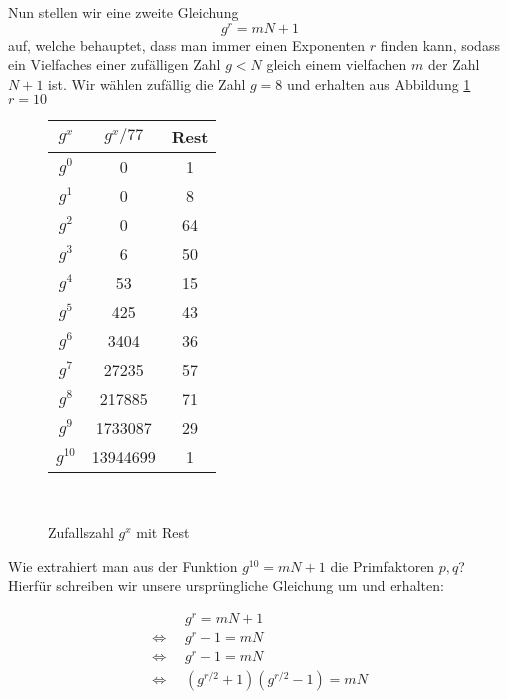 Nun stellen wir eine zweite Gleichung 
$${g^r = mN+1}$$ 
auf, welche behauptet, dass man immer einen Exponenten $r$ finden kann, sodass ein Vielfaches einer zufälligen Zahl $g < N$ gleich einem vielfachen $m$ der Zahl $N+1$ ist.
Wir wählen zufällig die Zahl $g = 8$ und erhalten aus Abbildung \ref{fig:Zufallszahl $g^x$ mit Rest} $r = 10$

\begin{figure}[h]
    \begin{center}
        \begin{tabular}{|c|c|c|} \hline
            $g^x$       &   $g^x/77$    &   Rest    \\\hline
            $g^0$       &   0           &   1       \\\hline
            $g^1$       &   0           &   8       \\\hline
            $g^2$       &   0           &   64      \\\hline
            $g^3$       &   6           &   50      \\\hline
            $g^4$       &   53          &   15      \\\hline
            $g^5$       &   425         &   43      \\\hline
            $g^6$       &   3404        &   36      \\\hline
            $g^7$       &   27235       &   57      \\\hline
            $g^8$       &   217885      &   71      \\\hline
            $g^9$       &   1733087     &   29      \\\hline
            $g^{10}$    &   13944699    &   1       \\\hline
        \end{tabular}\\
    \end{center}
    \caption{Zufallszahl $g^x$ mit Rest}
    \label{fig:Zufallszahl $g^x$ mit Rest}
\end{figure}

Wie extrahiert man aus der Funktion $g^{10} = mN + 1$ die Primfaktoren $p, q$? Hierfür schreiben wir unsere ursprüngliche Gleichung um und erhalten:

\begin{align*}
                        &   g^r = mN+1      \\
    \Leftrightarrow\;\; &   g^r - 1 = mN    \\
    \Leftrightarrow\;\; &   g^r - 1 = mN    \\
    \Leftrightarrow\;\; &   (g^{r/2} + 1)(g^{r/2} - 1) = mN
\end{align*}

